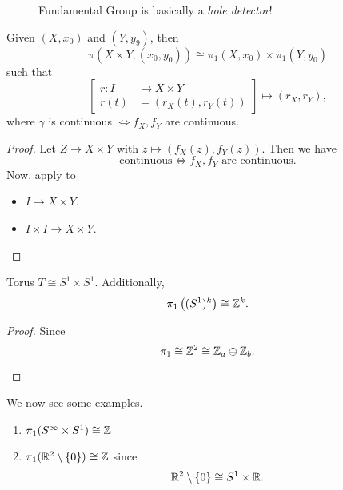 \begin{figure}[H]
	\centering
	\caption{Fundamental Group is basically a \emph{hole detector}!}
	\label{fig:fundamental-group-hole-detector}
\end{figure}


\begin{theorem}
	Given \((X, x_0)\) and \((Y, y_9)\), then
	\[
		\pi (X\times Y, (x_0, y_0)) \cong \pi_1(X, x_0)\times \pi _1(Y, y_0)
	\]
	such that
	\[
		\left[\begin{alignedat}{3}
				r\colon I&\to X\times Y\\
				r(t) &= \left(r_X(t), r_Y(t)\right)
			\end{alignedat}\right] \mapsto (r_{X}, r_{Y}),
	\]
	where \(\gamma\) is continuous \(\iff f_{X}, f_{Y}\) are continuous.
\end{theorem}
\begin{proof}
	Let \(Z\to X\times Y\) with \(z\mapsto \left(f_{X}(z), f_{Y}(z)\right)\). Then we have
	\[
		\text{continuous}\iff f_{X}, f_{Y}  \text{ are continuous}.
	\]
	Now, apply to
	\begin{itemize}
		\item \(I\to X\times Y\).
		\item \(I\times I\to X\times Y\).
	\end{itemize}
\end{proof}

\begin{corollary}
	Torus \(T\cong S^{1}\times S^1\). Additionally,
	\[
		\pi _1\left((S^1)^k\right) \cong \mathbb{\MakeUppercase{z}} ^k.
	\]
\end{corollary}
\begin{proof}
	Since
	\[
		\pi _1 \cong \mathbb{\MakeUppercase{z}}^2 \cong \mathbb{\MakeUppercase{z}} _a \oplus \mathbb{\MakeUppercase{z}} _b.
	\]
	\begin{figure}[H]
		\centering
		\label{fig:pf:torus-fundamental-group}
	\end{figure}
\end{proof}

\begin{eg}
	We now see some examples.
	\begin{enumerate}
		\item \(\pi _1(S^{\infty }\times S^1) \cong \mathbb{\MakeUppercase{z}} \)
		\item \(\pi _1(\mathbb{\MakeUppercase{r}} ^2\setminus \{0\}) \cong \mathbb{\MakeUppercase{z}} \) since
		      \[
			      \mathbb{\MakeUppercase{r}} ^2\setminus \{0\}\cong S^{1}\times \mathbb{\MakeUppercase{r}} .
		      \]
	\end{enumerate}
\end{eg}


